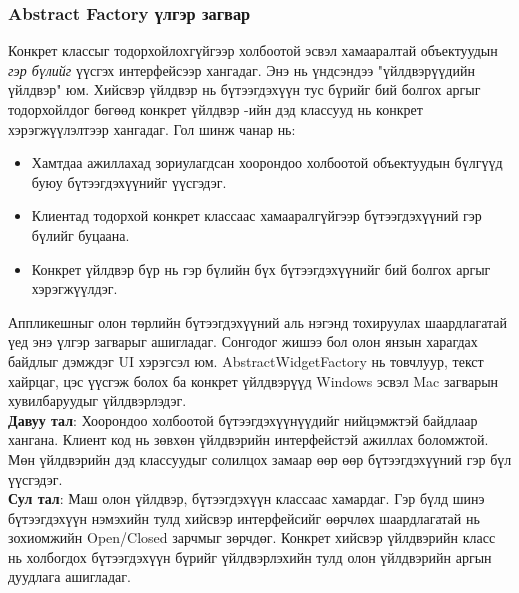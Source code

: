 \subsubsection{Abstract Factory үлгэр загвар}
\quad \quad Конкрет классыг тодорхойлохгүйгээр холбоотой эсвэл хамааралтай объектуудын \textit{гэр бүлийг} үүсгэх интерфейсээр хангадаг. Энэ нь үндсэндээ "үйлдвэрүүдийн үйлдвэр" юм. Хийсвэр үйлдвэр нь бүтээгдэхүүн тус бүрийг бий болгох аргыг тодорхойлдог бөгөөд конкрет үйлдвэр -ийн дэд классууд нь конкрет хэрэгжүүлэлтээр хангадаг. Гол шинж чанар нь:
\begin{itemize}
	\item Хамтдаа ажиллахад зориулагдсан хоорондоо холбоотой объектуудын бүлгүүд буюу бүтээгдэхүүнийг үүсгэдэг.
	\item Клиентад тодорхой конкрет классаас хамааралгүйгээр бүтээгдэхүүний гэр бүлийг буцаана.
	\item Конкрет үйлдвэр бүр нь гэр бүлийн бүх бүтээгдэхүүнийг бий болгох аргыг хэрэгжүүлдэг.
\end{itemize}
Аппликешныг олон төрлийн бүтээгдэхүүний аль нэгэнд тохируулах шаардлагатай үед энэ үлгэр загварыг ашигладаг. Сонгодог жишээ бол олон янзын харагдах байдлыг дэмждэг UI хэрэгсэл юм. AbstractWidgetFactory нь товчлуур, текст хайрцаг, цэс үүсгэж болох ба конкрет үйлдвэрүүд Windows эсвэл Mac загварын хувилбаруудыг үйлдвэрлэдэг.\\
\textbf{Давуу тал}: Хоорондоо холбоотой бүтээгдэхүүнүүдийг нийцэмжтэй байдлаар хангана. Клиент код нь зөвхөн үйлдвэрийн интерфейстэй ажиллах боломжтой. Мөн үйлдвэрийн дэд классуудыг солилцох замаар өөр өөр бүтээгдэхүүний гэр бүл үүсгэдэг. \\
\textbf{Сул тал}: Маш олон үйлдвэр, бүтээгдэхүүн классаас хамардаг. Гэр бүлд шинэ бүтээгдэхүүн нэмэхийн тулд хийсвэр интерфейсийг өөрчлөх шаардлагатай нь зохиомжийн Open/Closed зарчмыг зөрчдөг. Конкрет хийсвэр үйлдвэрийн класс нь холбогдох бүтээгдэхүүн бүрийг үйлдвэрлэхийн тулд олон үйлдвэрийн аргын дуудлага ашигладаг.

